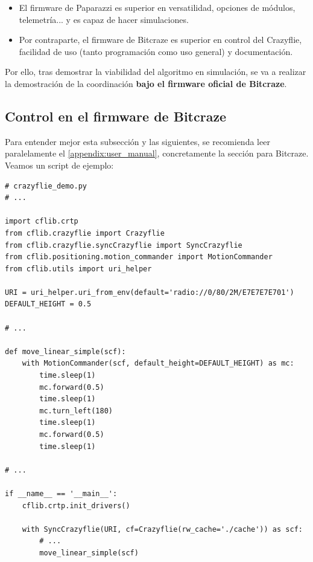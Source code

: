 \begin{itemize}
    \item El firmware de Paparazzi es superior en versatilidad, opciones de módulos, telemetría... y es capaz de hacer simulaciones.
    \item Por contraparte, el firmware de Bitcraze es superior en control del Crazyflie, facilidad de uso (tanto programación como uso general) y documentación.
\end{itemize}

Por ello, tras demostrar la viabilidad del algoritmo en simulación, se va a realizar la demostración de la coordinación \textbf{bajo el firmware oficial de Bitcraze}.


\subsection{Control en el firmware de Bitcraze}

Para entender mejor esta subsección y las siguientes,
se recomienda leer paralelamente el \autoref{appendix:user_manual},
concretamente la sección para Bitcraze. Veamos un script de ejemplo:

\begin{lstlisting}[style=CodigoPython]
# crazyflie_demo.py
# ...

import cflib.crtp
from cflib.crazyflie import Crazyflie
from cflib.crazyflie.syncCrazyflie import SyncCrazyflie
from cflib.positioning.motion_commander import MotionCommander
from cflib.utils import uri_helper

URI = uri_helper.uri_from_env(default='radio://0/80/2M/E7E7E7E701')
DEFAULT_HEIGHT = 0.5

# ...

def move_linear_simple(scf):
    with MotionCommander(scf, default_height=DEFAULT_HEIGHT) as mc:
        time.sleep(1)
        mc.forward(0.5)
        time.sleep(1)
        mc.turn_left(180)
        time.sleep(1)
        mc.forward(0.5)
        time.sleep(1)

# ...

if __name__ == '__main__':
    cflib.crtp.init_drivers()

    with SyncCrazyflie(URI, cf=Crazyflie(rw_cache='./cache')) as scf:
        # ...
        move_linear_simple(scf)
\end{lstlisting}

